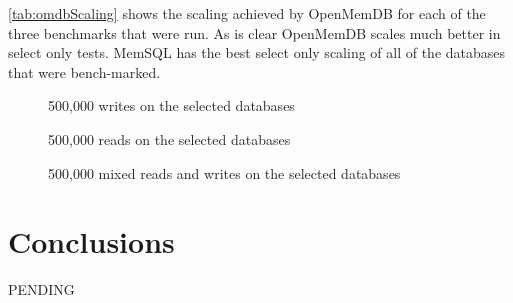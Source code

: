 \documentclass[conference, compsoc]{IEEEtran}
\begin{document}
\ref{tab:omdbScaling} shows the scaling achieved by OpenMemDB for each of the three
benchmarks that were run. As is clear OpenMemDB scales much better in select only tests. 
MemSQL has the best select only scaling of all of the databases that were bench-marked.  

\begin{figure}
  \caption{500,000 writes on the selected databases}
\end{figure}

\begin{figure}
  \caption{500,000 reads on the selected databases}
\end{figure}

\begin{figure}
  \caption{500,000 mixed reads and writes on the selected databases}
\end{figure}

\section{Conclusions}
PENDING

\newpage


\newpage
\end{document}
